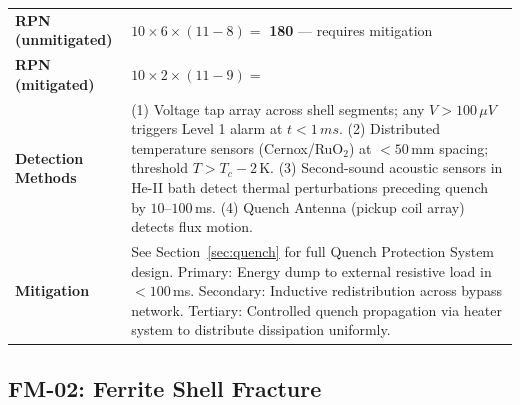 \documentclass[11pt,a4paper]{article}
\newcommand{\Scrit}[1]{\cellcolor{risk-critical!40}\textbf{#1}}
\newcommand{\Smed}[1]{\cellcolor{risk-medium!40}{#1}}
\begin{document}
\begin{longtable}{p{0.25\tw}p{0.65\tw}}
\textbf{RPN (unmitigated)} & $10 \times 6 \times (11-8) = $ \Scrit{180}
  --- requires mitigation \\[4pt]
\textbf{RPN (mitigated)} & $10 \times 2 \times (11-9) = $ \Smed{40} \\[4pt]
\textbf{Detection Methods} &
  (1) Voltage tap array across shell segments; any $V > 100\,\si{\mu V}$
  triggers Level 1 alarm at $t < 1\,\si{ms}$. (2) Distributed temperature
  sensors (Cernox/RuO$_2$) at $< 50$\,mm spacing; threshold
  $T > T_c - 2$\,K. (3) Second-sound acoustic sensors in He-II bath
  detect thermal perturbations preceding quench by $10$--$100$\,ms.
  (4) Quench Antenna (pickup coil array) detects flux motion. \\[4pt]
\textbf{Mitigation} & See Section~\ref{sec:quench} for full Quench
  Protection System design. Primary: Energy dump to external resistive
  load in $< 100$\,ms. Secondary: Inductive redistribution across
  bypass network. Tertiary: Controlled quench propagation via heater
  system to distribute dissipation uniformly. \\
\bottomrule
\end{longtable}

\subsection{FM-02: Ferrite Shell Fracture}
\end{document}
